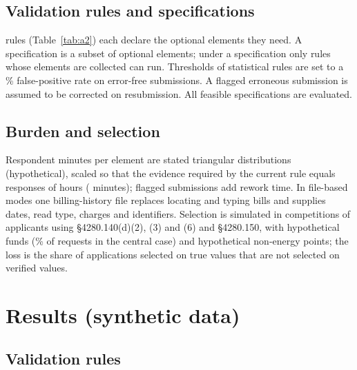\documentclass[10pt]{article}
\begin{document}
\subsection{Validation rules and specifications}
\NRules{} rules (Table~\ref{tab:a2}) each declare the optional elements they need. A
specification is a subset of \NOptionalElements{} optional elements; under a specification
only rules whose elements are collected can run. Thresholds of statistical rules are set
to a \StatRuleFpr\% false-positive rate on error-free submissions. A flagged erroneous
submission is assumed to be corrected on resubmission. All \NSpecs{} feasible
specifications are evaluated.

\subsection{Burden and selection}\label{sec:burden}
Respondent minutes per element are stated triangular distributions (hypothetical),
scaled so that the evidence required by the current rule equals \AnchorResponses{}
responses of \AuditHoursPerResponse{} hours (\AnchorMinutes{} minutes); flagged
submissions add rework time. In file-based modes one billing-history file replaces
locating and typing bills and supplies dates, read type, charges and identifiers.
Selection is simulated in \NCompetitions{} competitions of \NCompetitionApplicants{}
applicants using \S4280.140(d)(2), (3) and (6) and \S4280.150, with hypothetical funds
(\CfgFundingRatio\% of requests in the central case) and hypothetical non-energy points;
the loss is the share of applications selected on true values that are not selected on
verified values.

\section{Results (synthetic data)}

\subsection{Validation rules}

{\scriptsize
\begin{table}[h]
\caption{Synthetic data. Validation rules, required optional elements, false-positive
rate on error-free submissions (FP, \%) and detection rate (\%) by injected error class: U
unit, T transposed digits, P wrong period, D double counting, G gross/net, N nameplate
$\times$ hours (\NPerClass{} synthetic applicants per class).}\label{tab:a2}
\centering\scriptsize

\end{table}
}
\end{document}
